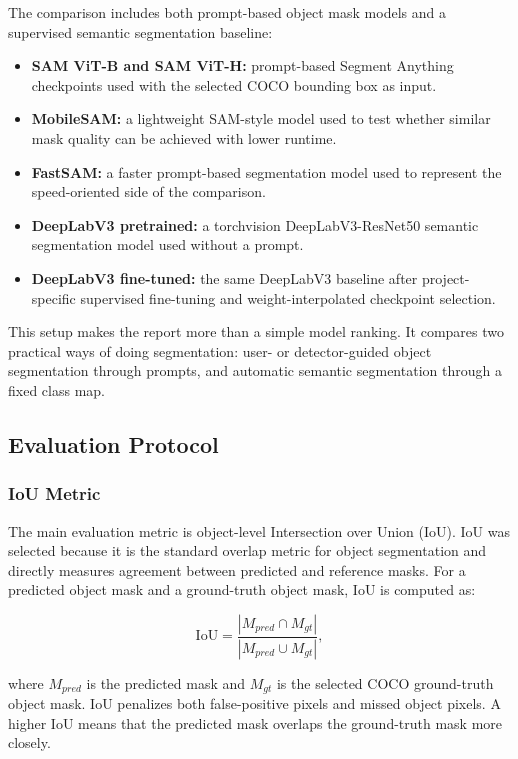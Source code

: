 \documentclass[9pt,a4paper,oneside]{rho-class/rho}
\begin{document}
    The comparison includes both prompt-based object mask models and a supervised semantic segmentation baseline:

    \begin{itemize}
        \item \textbf{SAM ViT-B and SAM ViT-H:} prompt-based Segment Anything checkpoints used with the selected COCO bounding box as input.
        \item \textbf{MobileSAM:} a lightweight SAM-style model used to test whether similar mask quality can be achieved with lower runtime.
        \item \textbf{FastSAM:} a faster prompt-based segmentation model used to represent the speed-oriented side of the comparison.
        \item \textbf{DeepLabV3 pretrained:} a torchvision DeepLabV3-ResNet50 semantic segmentation model used without a prompt.
        \item \textbf{DeepLabV3 fine-tuned:} the same DeepLabV3 baseline after project-specific supervised fine-tuning and weight-interpolated checkpoint selection.
    \end{itemize}

    This setup makes the report more than a simple model ranking. It compares two practical ways of doing segmentation: user- or detector-guided object segmentation through prompts, and automatic semantic segmentation through a fixed class map.

\subsection{Evaluation Protocol}

\subsubsection{IoU Metric}

    The main evaluation metric is object-level Intersection over Union (IoU). IoU was selected because it is the standard overlap metric for object segmentation and directly measures agreement between predicted and reference masks. For a predicted object mask and a ground-truth object mask, IoU is computed as:

    \begin{equation}
        \mathrm{IoU} = \frac{|M_{pred} \cap M_{gt}|}{|M_{pred} \cup M_{gt}|},
        \label{eq:iou}
    \end{equation}

    where \(M_{pred}\) is the predicted mask and \(M_{gt}\) is the selected COCO ground-truth object mask. IoU penalizes both false-positive pixels and missed object pixels. A higher IoU means that the predicted mask overlaps the ground-truth mask more closely.
\end{document}
